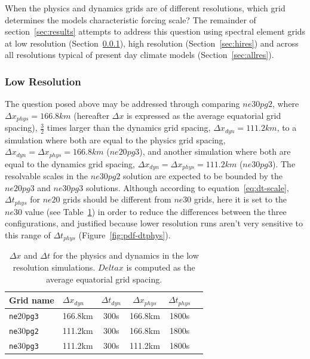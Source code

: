 \documentclass{agujournal}
\begin{document}
When the physics and dynamics grids are of different resolutions, which grid determines the models characteristic forcing scale? The remainder of section~\ref{sec:results} attempts to address this question using spectral element grids at low resolution (Section~\ref{sec:lores}), high resolution (Section~\ref{sec:hires}) and across all resolutions typical of present day climate models (Section~\ref{sec:allres}).

\subsubsection{Low Resolution}\label{sec:lores}

The question posed above may be addressed through comparing $ne30pg2$, where $\Delta x_{phys} = 166.8km$ (hereafter $\Delta x$ is expressed as the average equatorial grid spacing), $\frac{3}{2}$ times larger than the dynamics grid spacing, $\Delta x_{dyn} = 111.2km$, to a simulation where both are equal to the physics grid spacing, $\Delta x_{dyn} = \Delta x_{phys} = 166.8 km$ ($ne20pg3$), and another simulation where both are equal to the dynamics grid spacing, $\Delta x_{dyn} = \Delta x_{phys} = 111.2 km$ ($ne30pg3$). The resolvable scales in the $ne30pg2$ solution are expected to be bounded by the $ne20pg3$ and $ne30pg3$ solutions. Although according to equation~\eqref{eq:dt-scale}, $\Delta t_{phys}$ for $ne20$ grids should be different from $ne30$ grids, here it is set to the $ne30$ value (see Table~\ref{table:grids-lo}) in order to reduce the differences between the three configurations, and justified because lower resolution runs aren't very sensitive to this range of $\Delta t_{phys}$ (Figure~\ref{fig:pdf-dtphys}).

 \begin{table}
 \caption{$\Delta x$ and $\Delta t$ for the physics and dynamics in the low resolution simulations. $Delta x$ is computed as the average equatorial grid spacing.}
 \centering
 \begin{tabular}{llcccc}
 \hline
 Grid name & $\Delta x_{dyn}$  & $\Delta t_{dyn}$ & $\Delta x_{phys}$  & $\Delta t_{phys}$ \\
 \hline
   {\tt{ne}}20{\tt{pg3}}  & 166.8km & 300s  & 166.8km & 1800s \\
   {\tt{ne}}30{\tt{pg2}}  & 111.2km & 300s  & 166.8km & 1800s \\
   {\tt{ne}}30{\tt{pg3}}  & 111.2km & 300s  & 111.2km & 1800s \\
 \hline
 \end{tabular}
 \label{table:grids-lo}
 \end{table}
\end{document}
